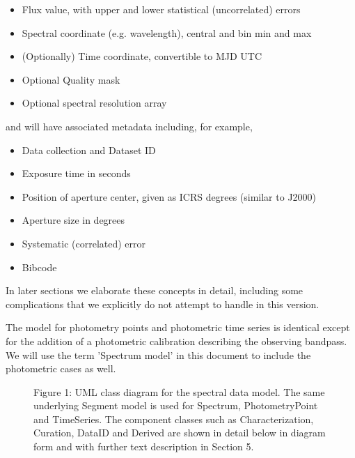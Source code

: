 \documentclass[11pt]{article}
\newcommand{\new}{\color{red}}
\begin{document}
\colorbox{ipink}{
\begin{minipage}{0.9\textwidth}

\begin{itemize}
\item Flux value, with upper and lower statistical (uncorrelated) errors 
\item Spectral coordinate  (e.g. wavelength), central and bin min and max 
\item (Optionally) Time coordinate, convertible to MJD UTC
\item Optional Quality mask
\item Optional spectral resolution array
\end{itemize}
\end{minipage}
}

\vskip 0.1in

and will have associated metadata including, for example,

\vskip 0.1in

\colorbox{ipink}{
\begin{minipage}{0.9\textwidth}
\begin{itemize}
\item Data collection and Dataset ID
\item Exposure time in seconds
\item Position of aperture center, given as ICRS degrees
(similar to J2000)
\item Aperture size in degrees
\item Systematic (correlated) error
\item Bibcode
\end{itemize}
\end{minipage}
}

\vskip 0.1in

In later sections we elaborate these concepts in detail, including some
complications that we explicitly do not attempt to handle in this
version.

{\new
The model for photometry points and photometric time series is identical except for the addition
of a photometric calibration describing the observing bandpass. We will use the term 'Spectrum model'
in this document to include the photometric cases as well.
}

\begin{figure}[h]

\colorbox{iblue}{
}




\colorbox{iblue}{

\begin{minipage}{6.0in}
Figure 1: 
UML class diagram for the spectral data model.
The same underlying Segment model is used for Spectrum, PhotometryPoint and TimeSeries.
The component classes such as Characterization, Curation, DataID and Derived are 
shown in detail below in diagram form and
with further text description in Section 5.
\end{minipage}
}
\end{figure}
\end{document}
